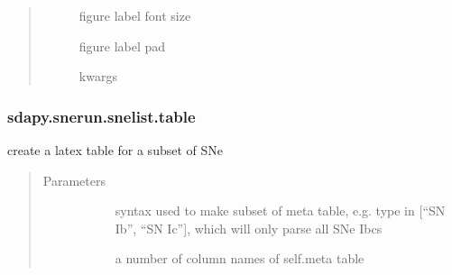 \documentclass[letterpaper,10pt,english]{sphinxmanual}
\begin{document}
\begin{fulllineitems}
\begin{fulllineitems}
\begin{quote}
\begin{description}
\begin{description}
\item[{}] \leavevmode{[}\sphinxtitleref{str}{]}
figure label font size

\item[{}] \leavevmode{[}\sphinxtitleref{str}{]}
figure label pad

\item[{}] \leavevmode{[}\sphinxtitleref{Keyword Arguments}{]}
 kwargs

\end{description}

\end{description}\end{quote}

\end{fulllineitems}



\subsubsection{sdapy.snerun.snelist.table}
\label{\detokenize{generated/sdapy.snerun.snelist.table:sdapy-snerun-snelist-table}}\label{\detokenize{generated/sdapy.snerun.snelist.table::doc}}

\begin{fulllineitems}
\label{\detokenize{generated/sdapy.snerun.snelist.table:sdapy.snerun.snelist.table}}
create a latex table for a subset of SNe
\begin{quote}\begin{description}
\item[{Parameters}] \leavevmode\begin{description}
\item[{}] \leavevmode{[}\sphinxtitleref{str}{]}
syntax used to make subset of meta table, e.g.
type in {[}“SN Ib”, “SN Ic”{]}, which will only parse all SNe Ibcs

\item[{}] \leavevmode{[}\sphinxtitleref{list}{]}
a number of column names of self.meta table


\end{description}
\end{description}
\end{quote}
\end{fulllineitems}
\end{fulllineitems}
\end{document}
